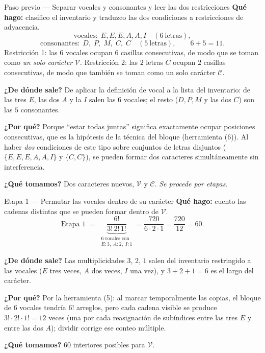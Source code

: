\documentclass[11pt]{article}
\begin{document}
\begin{paso}{Paso previo --- Separar vocales y consonantes y leer las dos restricciones}
\textbf{Qu\'e hago:} clasifico el inventario y traduzco las dos condiciones a restricciones de adyacencia.
\[
\text{vocales}:\; E,E,E,A,A,I \quad (6\ \text{letras}),
\]
\[
\text{consonantes}:\; D,\;P,\;M,\;C,\;C \quad (5\ \text{letras}),\qquad 6+5=11 .
\]
Restricci\'on 1: las $6$ vocales ocupan $6$ casillas consecutivas, de modo que se toman como \emph{un solo
car\'acter} $\mathcal{V}$. Restricci\'on 2: las $2$ letras $C$ ocupan $2$ casillas consecutivas, de modo que
tambi\'en se toman como un solo car\'acter $\mathcal{C}$.

\textbf{¿De d\'onde sale?} De aplicar la definici\'on de vocal a la lista del inventario: de las tres $E$,
las dos $A$ y la $I$ salen las $6$ vocales; el resto ($D,P,M$ y las dos $C$) son las $5$ consonantes.

\textbf{¿Por qu\'e?} Porque ``estar todas juntas'' significa exactamente ocupar posiciones consecutivas, que
es la hip\'otesis de la t\'ecnica del bloque (herramienta (6)). Al haber \emph{dos} condiciones de este tipo
sobre conjuntos de letras disjuntos ($\{E,E,E,A,A,I\}$ y $\{C,C\}$), se pueden formar dos caracteres
simult\'aneamente sin interferencia.

\textbf{¿Qu\'e tomamos?} Dos caracteres nuevos, $\mathcal{V}$ y $\mathcal{C}$. \emph{Se procede por etapas.}
\end{paso}

\begin{paso}{Etapa 1 --- Permutar las vocales dentro de su car\'acter}
\textbf{Qu\'e hago:} cuento las cadenas distintas que se pueden formar dentro de $\mathcal{V}$.
\[
\text{Etapa 1}\;=\;\underbrace{\frac{6!}{3!\,2!\,1!}}_{\substack{6\ \text{vocales con}\\ E:3,\;A:2,\;I:1}}
=\frac{720}{6\cdot 2\cdot 1}=\frac{720}{12}=60 .
\]

\textbf{¿De d\'onde sale?} Las multiplicidades $3$, $2$, $1$ salen del inventario restringido a las vocales
($E$ tres veces, $A$ dos veces, $I$ una vez), y $3+2+1=6$ es el largo del car\'acter.

\textbf{¿Por qu\'e?} Por la herramienta (5): al marcar temporalmente las copias, el bloque de $6$ vocales
tendr\'ia $6!$ arreglos, pero cada cadena visible se produce $3!\cdot 2!\cdot 1!=12$ veces (una por cada
reasignaci\'on de sub\'indices entre las tres $E$ y entre las dos $A$); dividir corrige ese conteo m\'ultiple.

\textbf{¿Qu\'e tomamos?} $60$ interiores posibles para $\mathcal{V}$.
\end{paso}
\end{document}
